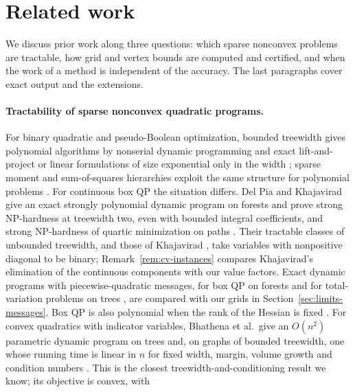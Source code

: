 \section{Related work}\label{sec:related}

We discuss prior work along three questions: which sparse nonconvex problems
are tractable, how grid and vertex bounds are computed and certified, and when
the work of a method is independent of the accuracy. The last paragraphs
cover exact output and the extensions.

\paragraph{Tractability of sparse nonconvex quadratic programs.}
For binary quadratic and pseudo-Boolean optimization, bounded treewidth gives
polynomial algorithms by nonserial dynamic programming
\cite{BerteleBrioschi1972,CramaHansenJaumard1990,Dechter1999} and exact
lift-and-project or linear formulations of size exponential only in the width
\cite{BienstockOzbay2004,WainwrightJordan2004,Laurent2009}; sparse moment and
sum-of-squares hierarchies exploit the same structure for polynomial problems
\cite{WakiEtAl2006,Lasserre2006}. For continuous box QP the situation differs.
Del Pia and Khajavirad give an exact strongly polynomial dynamic program on
forests and prove strong NP-hardness at treewidth two, even with bounded
integral coefficients, and strong NP-hardness of quartic minimization on paths
\cite[Theorems~1--3]{DelPiaKhajavirad2026}. Their tractable classes of
unbounded treewidth, and those of Khajavirad \cite{Khajavirad2026PolyBox},
take variables with nonpositive diagonal to be binary;
Remark~\ref{rem:cv-instances} compares Khajavirad's elimination of the
continuous components with our value factors.
Exact dynamic programs with piecewise-quadratic messages, for box QP on
forests \cite{DelPiaKhajavirad2026} and for total-variation problems on trees
\cite{KolmogorovPockRolinek2016,KuricAhmetspahicPock2024}, are compared with
our grids in Section~\ref{sec:limits-messages}. Box QP is also
polynomial when the rank of the Hessian is fixed
\cite{HladikCernyRada2021}. For convex quadratics with indicator variables,
Bhathena et al.\ give an $O(n^2)$ parametric dynamic program on trees
\cite{BhathenaEtAl2026Trees} and, on graphs of bounded treewidth, one whose
running time is linear in $n$ for fixed width, margin, volume growth and
condition numbers \cite{BhathenaEtAl2026Graphs}. This is the closest
treewidth-and-conditioning result we know; its objective is convex, with

